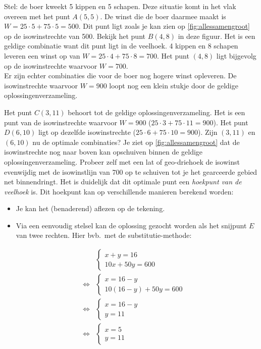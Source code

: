Stel: de boer
kweekt 5 kippen   en 5 schapen. Deze situatie komt in het vlak overeen met het punt $A(5,5)$. De winst die
de boer daarmee maakt is  $W = 25\cdot 5 + 75\cdot 5 = 500$.
Dit punt ligt zoals je kan zien op \cref{fig:allessamengroot} op de isowinstrechte
van 500. Bekijk het punt $B(4, 8)$ in deze
figuur.
Het is een geldige combinatie
want dit punt ligt in de veelhoek. 4 kippen en 8 schapen leveren
een winst op van $W = 25\cdot 4 + 75\cdot 8 = 700$.
Het punt $(4, 8)$ ligt bijgevolg op de isowinstrechte waarvoor $W=700$.\\
Er zijn echter combinaties die voor de boer nog hogere winst
opleveren. De isowinstrechte waarvoor $W= 900$ loopt nog
een klein stukje door de geldige oplossingenverzameling.

Het punt $C(3,11)$ behoort  tot de geldige oplossingenverzameling.
Het is een punt van de isowinstrechte waarvoor $W= 900$ ($ 25\cdot
3 + 75\cdot11=900$). Het punt $D(6,10)$ ligt op dezelfde isowinstrechte ($25\cdot 6+75\cdot 10=900$). 
Zijn $(3, 11)$ en $(6, 10)$ nu de optimale combinaties?
Je ziet op \cref{fig:allessamengroot} dat de isowinstrechte nog naar boven
kan opschuiven binnen de geldige oplossingenverzameling. Probeer zelf met een lat of geo-driehoek
de isowinst evenwijdig met de isowinstlijn van 700 op te
schuiven tot je het gearceerde gebied net binnendringt.
Het is duidelijk dat dit optimale punt een \emph{hoekpunt van de
veelhoek} is.
Dit hoekpunt kan op verschillende manieren berekend worden:

\begin{itemize}
    \item  Je kan het (benaderend) aflezen op de tekening.

    \item  Via een eenvoudig stelsel kan de oplossing gezocht worden als het
snijpunt $E$ van twee rechten. Hier bvb.\ met de substitutie-methode:
\end{itemize}
\begin{eqnarray*}
     &  &
    \left\{\begin{array}{l}
         x+y=16  \\
         10x+50y=600
     \end{array}
     \right.
       \\
     & \Leftrightarrow &  \left\{\begin{array}{l}
         x=16-y  \\
         10(16-y)+50y=600
     \end{array}
     \right. \\
     & \Leftrightarrow & \left\{\begin{array}{l}
         x=16-y  \\
         y=11
     \end{array}
     \right.  \\
     & \Leftrightarrow & \left\{\begin{array}{l}
         x=5  \\
         y=11
     \end{array}
     \right.
\end{eqnarray*}



